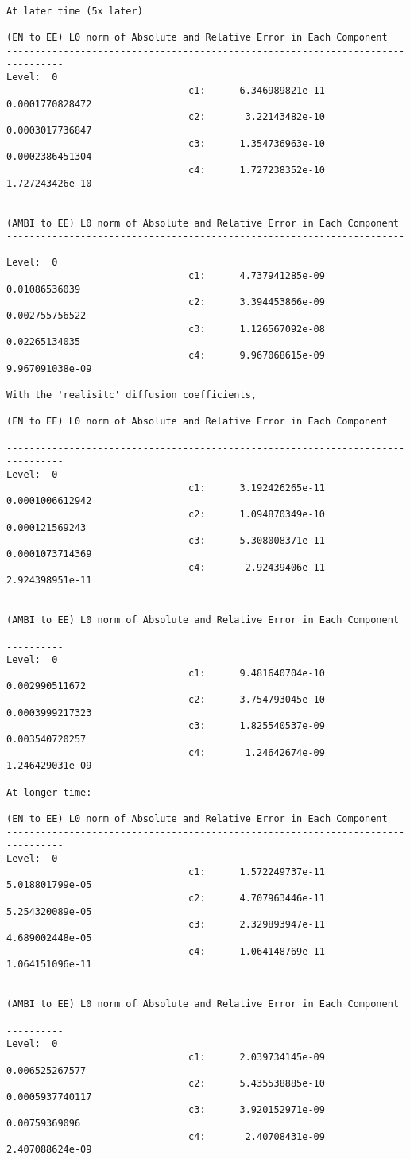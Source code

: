 \documentclass[final]{siamltex}
\begin{document}
\begin{verbatim}
At later time (5x later)

(EN to EE) L0 norm of Absolute and Relative Error in Each Component
--------------------------------------------------------------------------------
Level:  0
                                c1:      6.346989821e-11     0.0001770828472
                                c2:       3.22143482e-10     0.0003017736847
                                c3:      1.354736963e-10     0.0002386451304
                                c4:      1.727238352e-10     1.727243426e-10


(AMBI to EE) L0 norm of Absolute and Relative Error in Each Component
--------------------------------------------------------------------------------
Level:  0
                                c1:      4.737941285e-09       0.01086536039
                                c2:      3.394453866e-09      0.002755756522
                                c3:      1.126567092e-08       0.02265134035
                                c4:      9.967068615e-09     9.967091038e-09

With the 'realisitc' diffusion coefficients,

(EN to EE) L0 norm of Absolute and Relative Error in Each Component

--------------------------------------------------------------------------------
Level:  0
                                c1:      3.192426265e-11     0.0001006612942
                                c2:      1.094870349e-10      0.000121569243
                                c3:      5.308008371e-11     0.0001073714369
                                c4:       2.92439406e-11     2.924398951e-11


(AMBI to EE) L0 norm of Absolute and Relative Error in Each Component
--------------------------------------------------------------------------------
Level:  0
                                c1:      9.481640704e-10      0.002990511672
                                c2:      3.754793045e-10     0.0003999217323
                                c3:      1.825540537e-09      0.003540720257
                                c4:       1.24642674e-09     1.246429031e-09

At longer time:

(EN to EE) L0 norm of Absolute and Relative Error in Each Component
--------------------------------------------------------------------------------
Level:  0
                                c1:      1.572249737e-11     5.018801799e-05
                                c2:      4.707963446e-11     5.254320089e-05
                                c3:      2.329893947e-11     4.689002448e-05
                                c4:      1.064148769e-11     1.064151096e-11


(AMBI to EE) L0 norm of Absolute and Relative Error in Each Component
--------------------------------------------------------------------------------
Level:  0
                                c1:      2.039734145e-09      0.006525267577
                                c2:      5.435538885e-10     0.0005937740117
                                c3:      3.920152971e-09       0.00759369096
                                c4:       2.40708431e-09     2.407088624e-09
\end{verbatim}
\end{document}

